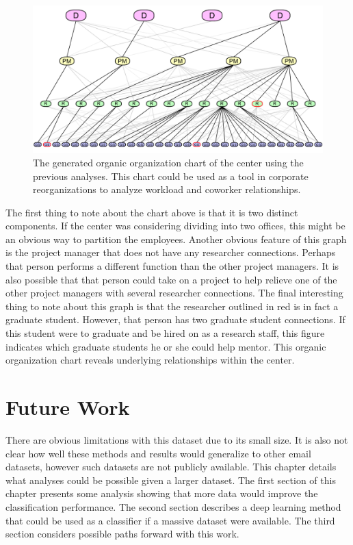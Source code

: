 \documentclass[12pt]{report}
\begin{document}
\begin{figure}[t]
	\centering
	\includegraphics[width=1.05\columnwidth,trim={0mm 0mm 0mm 0mm},clip]{orgChart_3con}
	\vspace{-7pt}
	\caption[Generated organic organization chart of the center]{The generated organic organization chart of the center using the previous analyses.  This chart could be used as a tool in corporate reorganizations to analyze workload and coworker relationships.}
	\label{fig:generated_hierarchy}
\end{figure}


The first thing to note about the chart above is that it is two distinct components.
If the center was considering dividing into two offices, this might be an obvious way to partition the employees.
Another obvious feature of this graph is the project manager that does not have any researcher connections.
Perhaps that person performs a different function than the other project managers.
It is also possible that that person could take on a project to help relieve one of the other project managers with several researcher connections.
The final interesting thing to note about this graph is that the researcher outlined in red is in fact a graduate student.
However, that person has two graduate student connections.
If this student were to graduate and be hired on as a research staff, this figure indicates which graduate students he or she could help mentor.
This organic organization chart reveals underlying relationships within the center.

\chapter{Future Work} \label{FutureWork}
There are obvious limitations with this dataset due to its small size.
It is also not clear how well these methods and results would generalize to other email datasets, however such datasets are not publicly available.
This chapter details what analyses could be possible given a larger dataset.
The first section of this chapter presents some analysis showing that more data would improve the classification performance.
The second section describes a deep learning method that could be used as a classifier if a massive dataset were available.
The third section considers possible paths forward with this work.
\end{document}
